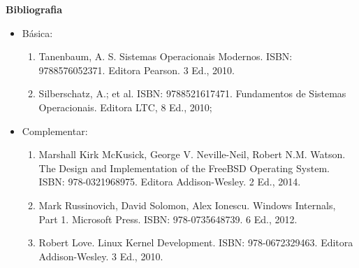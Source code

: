 









\begin{snugshade}\begin{center}\textbf{
    Bibliografia
}\end{center}\end{snugshade}

\begin{itemize} 
  \item Básica:
	\begin{enumerate}
		\item Tanenbaum, A. S. Sistemas Operacionais Modernos. ISBN: 9788576052371. Editora Pearson. 3 Ed., 2010. 
		\item Silberschatz, A.; et al. ISBN: 9788521617471. Fundamentos de Sistemas Operacionais. Editora LTC, 8 Ed., 2010; 
	\end{enumerate}
  \item Complementar:
	\begin{enumerate} 
		\item Marshall Kirk McKusick, George V. Neville-Neil, Robert N.M. Watson. The Design and Implementation of the FreeBSD Operating System. ISBN: 978-0321968975. Editora Addison-Wesley. 2 Ed., 2014.
		\item Mark Russinovich, David Solomon, Alex Ionescu. Windows Internals, Part 1. Microsoft Press. ISBN: 978-0735648739. 6 Ed., 2012.
		\item Robert Love. Linux Kernel Development. ISBN: 978-0672329463. Editora Addison-Wesley. 3 Ed., 2010.
	\end{enumerate}
\end{itemize}
